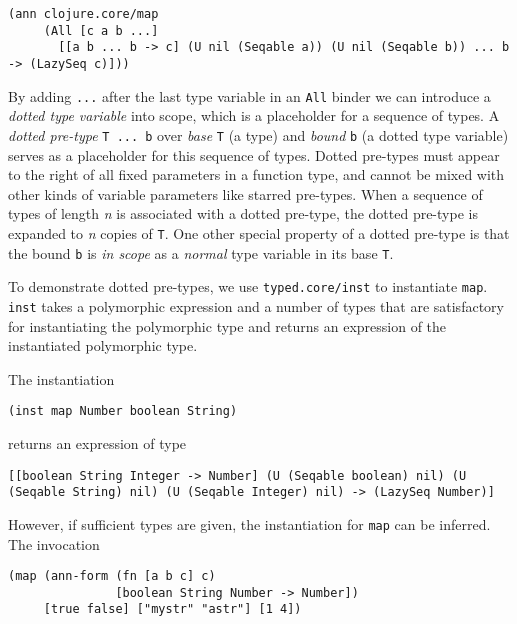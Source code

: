 \begin{lstlisting}[caption=Type signature for \lstinline|clojure.core/map|, label=lst:maptype]
(ann clojure.core/map
     (All [c a b ...]
       [[a b ... b -> c] (U nil (Seqable a)) (U nil (Seqable b)) ... b -> (LazySeq c)]))
\end{lstlisting}

By adding \lstinline|...| after the last type variable in an \lstinline|All| binder
we can introduce a \emph{dotted type variable} into scope, which is a placeholder for a sequence of types.
A \emph{dotted pre-type} \lstinline|T ... b| over \emph{base} \lstinline|T| (a type) and \emph{bound}
\lstinline|b| (a dotted type variable)
serves as a placeholder for this sequence of types.
Dotted pre-types must appear to the right of all fixed parameters in a function type,
and cannot be mixed with other kinds of variable parameters like starred pre-types.
When a sequence of types of length \emph{n} is associated with a dotted pre-type, 
the dotted pre-type is expanded to \emph{n} copies of \lstinline|T|.
One other special property of a dotted pre-type is that the bound \lstinline|b|
is \emph{in scope} as a \emph{normal} type variable in its base \lstinline|T|.

To demonstrate dotted pre-types, we use \lstinline|typed.core/inst| to instantiate
\lstinline|map|. \lstinline|inst| takes a polymorphic expression and a number of types
that are satisfactory for instantiating the polymorphic type and returns an expression
of the instantiated polymorphic type.

The instantiation

\begin{lstlisting}
(inst map Number boolean String)
\end{lstlisting}

returns an expression of type

\begin{lstlisting}
[[boolean String Integer -> Number] (U (Seqable boolean) nil) (U (Seqable String) nil) (U (Seqable Integer) nil) -> (LazySeq Number)]
\end{lstlisting}

However, if sufficient types are given, the instantiation for \lstinline|map| can be inferred.
The invocation

\begin{lstlisting}
(map (ann-form (fn [a b c] c) 
               [boolean String Number -> Number]) 
     [true false] ["mystr" "astr"] [1 4])
\end{lstlisting}

